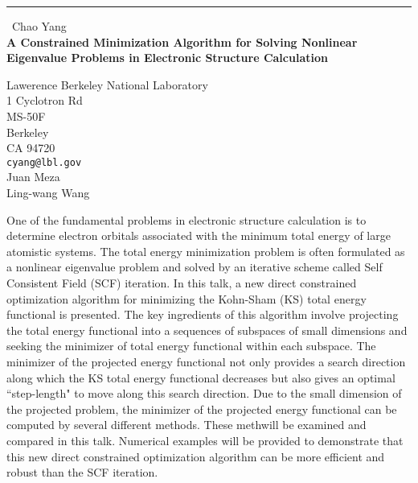 \documentclass{report}
\begin{document}
\begin{center}
\rule{6in}{1pt} \
{\large Chao Yang \\
{\bf A Constrained Minimization Algorithm for Solving Nonlinear Eigenvalue Problems in Electronic Structure Calculation}}

Lawerence Berkeley National Laboratory \\ 1 Cyclotron Rd \\ MS-50F \\ Berkeley \\ CA 94720
\\
{\tt cyang@lbl.gov}\\
Juan Meza\\
Ling-wang Wang\end{center}

One of the fundamental problems in electronic structure calculation
is to determine electron orbitals associated with the minimum total
energy of large atomistic systems. The total energy minimization problem
is often formulated as a nonlinear eigenvalue problem and
solved by an iterative scheme called Self Consistent Field (SCF)
iteration. In this talk, a new direct constrained optimization
algorithm for minimizing the Kohn-Sham (KS) total energy functional
is presented. The key ingredients of this algorithm involve projecting
the total energy functional into a sequences of subspaces of small
dimensions and seeking the minimizer of total energy functional within
each subspace. The minimizer of the projected energy functional not only
provides a search direction along which the KS total energy functional
decreases but also gives an optimal ``step-length" to move along this
search direction. Due to the small dimension of the projected problem,
the minimizer of the projected energy functional can be computed by
several different methods. These methwill be examined and compared in
this talk. Numerical examples will be provided to demonstrate that this
new direct constrained optimization algorithm can be more efficient and
robust than the SCF iteration.
\end{document}
